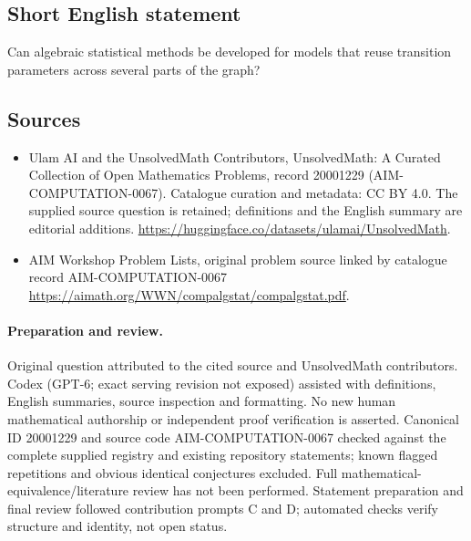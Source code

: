 \documentclass[11pt]{article}
\begin{document}
\subsection{Short English statement}
Can algebraic statistical methods be developed for models that reuse transition parameters across several parts of the graph?
\subsection{Sources}
\begin{itemize}
\item[\hypertarget{source:20001229:1}{S1}] Ulam AI and the UnsolvedMath Contributors, UnsolvedMath: A Curated Collection of Open Mathematics Problems, record 20001229 (AIM-COMPUTATION-0067). Catalogue curation and metadata: CC BY 4.0. The supplied source question is retained; definitions and the English summary are editorial additions.
\url{https://huggingface.co/datasets/ulamai/UnsolvedMath}.
\item[\hypertarget{source:20001229:2}{S2}] AIM Workshop Problem Lists, original problem source linked by catalogue record AIM-COMPUTATION-0067
\url{https://aimath.org/WWN/compalgstat/compalgstat.pdf}.
\end{itemize}
\paragraph{Preparation and review.}
Original question attributed to the cited source and UnsolvedMath contributors. Codex (GPT-6; exact serving revision not exposed) assisted with definitions, English summaries, source inspection and formatting. No new human mathematical authorship or independent proof verification is asserted. Canonical ID 20001229 and source code AIM-COMPUTATION-0067 checked against the complete supplied registry and existing repository statements; known flagged repetitions and obvious identical conjectures excluded. Full mathematical-equivalence/literature review has not been performed. Statement preparation and final review followed contribution prompts C and D; automated checks verify structure and identity, not open status.
\label{end:20001229}
\end{document}
